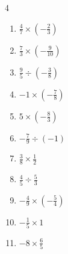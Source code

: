\begin{multicols}{4}
\begin{enumerate}
  \item $\displaystyle \frac{4}{7}\times{}\left(-\frac{2}{3}\right)$


  \item $\displaystyle \frac{7}{3}\times{}\left(-\frac{9}{10}\right)$


  \item $\displaystyle \frac{9}{5}\div{}\left(-\frac{3}{8}\right)$


  \item $\displaystyle -1\times{}\left(-\frac{7}{8}\right)$


  \item $\displaystyle 5\times{}\left(-\frac{8}{3}\right)$


  \item $\displaystyle -\frac{7}{9}\div{}\left(-1\right)$


  \item $\displaystyle \frac{3}{8}\times{}\frac{1}{2}$


\columnbreak %

\resetques

  \item $\displaystyle \frac{4}{5}\div{}\frac{5}{3}$


  \item $\displaystyle -\frac{4}{9}\times{}\left(-\frac{5}{4}\right)$


  \item $\displaystyle -\frac{1}{5}\times{}1$


  \item $\displaystyle -8\times{}\frac{6}{5}$



\end{enumerate}
\end{multicols}
